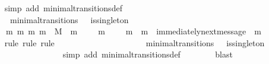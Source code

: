 \begin{isabellebody}
\ \ \ \ \isamarkupfalse%
\ {\isacharparenleft}simp\ add{\isacharcolon}\ minimal{\isacharunderscore}transitions{\isacharunderscore}def{\isacharparenright}\isanewline
\ \ \isamarkupfalse%
\ {\isachardoublequoteopen}{\isasymforall}\ {\isasymsigma}\ {\isasymsigma}{\isacharprime}{\isachardot}\ {\isacharparenleft}{\isasymsigma}{\isacharcomma}\ {\isasymsigma}{\isacharprime}{\isacharparenright}\ {\isasymin}\ minimal{\isacharunderscore}transitions\ {\isasymand}\ {\isasymnot}\ is{\isacharunderscore}singleton\ {\isacharparenleft}{\isasymsigma}{\isacharprime}{\isacharminus}\ {\isasymsigma}{\isacharparenright}\isanewline
\ \ \ \ {\isasymlongrightarrow}\ {\isacharparenleft}{\isasymexists}\ m{}\ m{}{\isachardot}\ {\isacharbraceleft}m{}{\isacharcomma}\ m{}{\isacharbraceright}\ {\isasymsubseteq}\ M\ {\isasymand}\ m{}\ {\isasymin}\ {\isasymsigma}{\isacharprime}{\isacharminus}\ {\isasymsigma}\ {\isasymand}\ m{}\ {\isasymin}\ {\isasymsigma}{\isacharprime}{\isacharminus}\ {\isasymsigma}\ {\isasymand}\ m{}\ {\isasymnoteq}\ m{}\ {\isasymand}\ immediately{\isacharunderscore}next{\isacharunderscore}message\ {\isacharparenleft}{\isasymsigma}{\isacharcomma}\ m{}{\isacharparenright}{\isacharparenright}{\isachardoublequoteclose}\isanewline
\ \ \ \ \isamarkupfalse%
\ {\isacharparenleft}rule{\isacharcomma}\ rule{\isacharcomma}\ rule{\isacharparenright}\ \isanewline
\ \ \isamarkupfalse%
\ {\isacharminus}\isanewline
\ \ \ \ \isamarkupfalse%
\ {\isasymsigma}\ {\isasymsigma}{\isacharprime}\isanewline
\ \ \ \ \isamarkupfalse%
\ {\isachardoublequoteopen}{\isacharparenleft}{\isasymsigma}{\isacharcomma}\ {\isasymsigma}{\isacharprime}{\isacharparenright}\ {\isasymin}\ minimal{\isacharunderscore}transitions\ {\isasymand}\ {\isasymnot}\ is{\isacharunderscore}singleton\ {\isacharparenleft}{\isasymsigma}{\isacharprime}\ {\isacharminus}\ {\isasymsigma}{\isacharparenright}{\isachardoublequoteclose}\isanewline
\ \ \ \ \isamarkupfalse%
\ \isamarkupfalse%
\ {\isachardoublequoteopen}{\isasymsigma}{\isacharprime}\ {\isacharminus}\ {\isasymsigma}\ {\isasymnoteq}\ {\isasymemptyset}{\isachardoublequoteclose}\isanewline
\ \ \ \ \ \ \isamarkupfalse%
\ {\isacharparenleft}simp\ add{\isacharcolon}\ minimal{\isacharunderscore}transitions{\isacharunderscore}def{\isacharparenright}\isanewline
\ \ \ \ \ \ \isamarkupfalse%
\ blast\isanewline
\ \ \ \ \isamarkupfalse%

\end{isabellebody}
